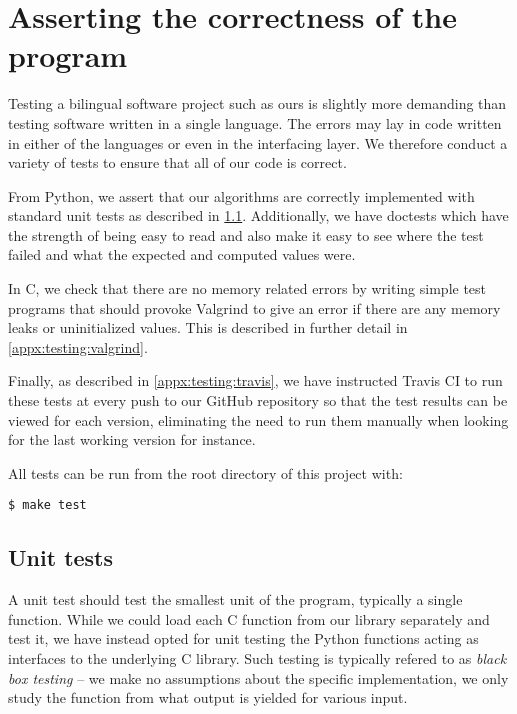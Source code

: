 \section{Asserting the correctness of the program}
\label{appx:testing}

Testing a bilingual software project such as ours is slightly more demanding than testing software written in a single language. The errors may lay in code written in either of the languages or even in the interfacing layer. We therefore conduct a variety of tests to ensure that all of our code is correct.

From Python, we assert that our algorithms are correctly implemented with standard unit tests as described in \ref{appx:testing:unit_tests}. Additionally, we have doctests which have the strength of being easy to read and also make it easy to see where the test failed and what the expected and computed values were.

In C, we check that there are no memory related errors by writing simple test programs that should provoke Valgrind to give an error if there are any memory leaks or uninitialized values. This is described in further detail in \ref{appx:testing:valgrind}.

Finally, as described in \ref{appx:testing:travis}, we have instructed Travis CI to run these tests at every push to our GitHub repository so that the test results can be viewed for each version, eliminating the need to run them manually when looking for the last working version for instance.

All tests can be run from the root directory of this project with:

\begin{verbatim}
$ make test
\end{verbatim}

\subsection{Unit tests}
\label{appx:testing:unit_tests}
A unit test should test the smallest unit of the program, typically a single function. While we could load each C function from our library separately and test it, we have instead opted for unit testing the Python functions acting as interfaces to the underlying C library. Such testing is typically refered to as \emph{black box testing} -- we make no assumptions about the specific implementation, we only study the function from what output is yielded for various input.

